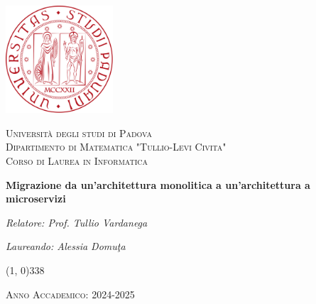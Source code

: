 \begin{titlepage}
    \begin{center}
        \includegraphics[width=0.3\textwidth]{BCS-Tessi/images/unipd_logo.png}\par\vspace{1cm}  %
        \textsc{\LARGE Università degli studi di Padova}\\[1.5cm]  %
        \textsc{\Large Dipartimento di Matematica "Tullio-Levi Civita"}\\[0.5cm]  %
        \textsc{\large Corso di Laurea in Informatica}\\[0.5cm]  %

        \vspace{10pt}

        \vspace{100pt}

        \begin{LARGE}
            \textbf{Migrazione da un'architettura monolitica a un'architettura a microservizi}\\
        \end{LARGE}

        \vspace{200pt}
        \begin{minipage}[t]{0.45\textwidth}
        
            \begin{flushleft}
                \textit{Relatore: Prof. Tullio Vardanega }\\
            \end{flushleft}
        \end{minipage}%
        \hfill
        \begin{minipage}[t]{0.45\textwidth}
            \begin{flushright}
                \textit{Laureando: Alessia Domu\c{t}a}\\
            \end{flushright}
        \end{minipage}

        \vfill
        \vspace{30pt}
        \line(1, 0){338} \\
        \begin{normalsize}
            \textsc{Anno Accademico: 2024-2025}
        \end{normalsize}
    \end{center}
\end{titlepage}
